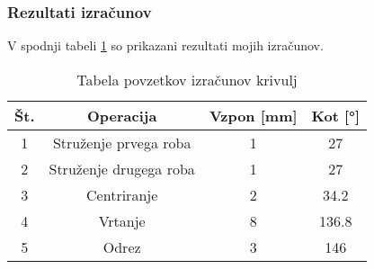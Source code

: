     \subsubsection{Rezultati izračunov}
        V spodnji tabeli \ref{Tabela rezultatov} so prikazani
        rezultati mojih izračunov.
        
        \begin{table}[H]
            \caption{Tabela povzetkov izračunov krivulj}
            \label{Tabela rezultatov}
            \begin{center}
                \begin{tabular}{|c|c|c|c|}
                    \hline
                    Št. & Operacija & Vzpon [mm] & Kot [°] \\
                    \hline
                    1 & Struženje prvega roba & 1 & 27 \\
                    \hline
                    2 & Struženje drugega roba & 1 & 27 \\
                    \hline
                    3 & Centriranje & 2 & 34.2 \\
                    \hline
                    4 & Vrtanje & 8 & 136.8 \\
                    \hline
                    5 & Odrez & 3 & 146 \\
                    \hline
                \end{tabular}
            \end{center}
        \end{table}
